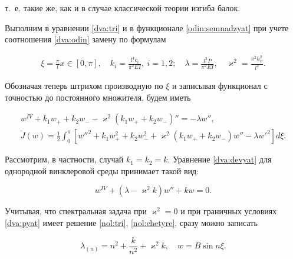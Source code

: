 т.~е. такие же, как и в случае классической теории изгиба балок.



Выполним в уравнении \eqref{dva:tri} и в функционале \eqref{odin:semnadzyat} при учете соотношения \eqref{dva:odin} замену по формулам

\begin{gather*} 

\xi=\frac{\pi}{l}x\in[0,\pi],\quad  k_i=\frac{l^4c_i}{\pi^2EI},\ i=1, 2; \quad 


\lambda=\frac{l^2P}{\pi^2EI},\quad  \varkappa^2=\frac{\pi^2h_\psi^2}{l^2}. 

\end{gather*}



Обозначая теперь штрихом производную по $\xi$ и записывая функционал с точностью до постоянного множителя, будем иметь

\begin{gather}

\label{dva:devyat}

w^{IV}+k_1w_++k_2w_--\varkappa^2(k_1w_++k_2w_-)''=-\lambda w'', \\

\label{dva:desyat}

\tilde{J}(w)=\frac{1}{2}\int_0^\pi\left[w''^2+k_1w_+^2+k_2w_-^2+\varkappa^2(k_1w_++k_2w_-)w''-\lambda w'^2\right]d\xi.

\end{gather}



Рассмотрим, в частности, случай $k_1=k_2=k$. Уравнение \eqref{dva:devyat} для однородной винклеровой среды принимает такой вид:

\begin{equation*} %

w^{IV}+(\lambda-\varkappa^2k)w''+kw=0.

\end{equation*}

Учитывая, что спектральная задача при $\varkappa^2=0$ и при граничных условиях \eqref{dva:pyat} имеет решение \eqref{nol:tri}, \eqref{nol:chetyre}, сразу можно записать

\begin{equation}\label{dva:dvenadzyat}

\lambda_{(n)}=n^2+\frac{k}{n^2}+\varkappa^2k,\quad w=B\sin n\xi.

\end{equation}



